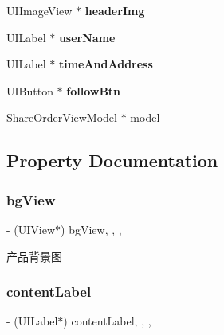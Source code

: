 \begin{DoxyCompactItemize}
\item 
\mbox{\label{interface_share_details_cell_adc57995f3561242d09f290796a3e4274}} 
U\+I\+Image\+View $\ast$ {\bfseries header\+Img}
\item 
\mbox{\label{interface_share_details_cell_a6776d4a0c07ea41e931193a2515f7701}} 
U\+I\+Label $\ast$ {\bfseries user\+Name}
\item 
\mbox{\label{interface_share_details_cell_a802beea7ae23e920023619a5473c52c4}} 
U\+I\+Label $\ast$ {\bfseries time\+And\+Address}
\item 
\mbox{\label{interface_share_details_cell_aebe6144c268f943e3e947ac1ab1e0619}} 
U\+I\+Button $\ast$ {\bfseries follow\+Btn}
\item 
\mbox{\hyperlink{interface_share_order_view_model}{Share\+Order\+View\+Model}} $\ast$ \mbox{\hyperlink{interface_share_details_cell_a6302ab5dee8cc60ea2defd78fee5d416}{model}}
\end{DoxyCompactItemize}


\subsection{Property Documentation}
\mbox{\label{interface_share_details_cell_a9c7c5c4c044c86e5a21a3d846b096cd4}} 
\subsubsection{\texorpdfstring{bg\+View}{bgView}}
{\footnotesize\ttfamily -\/ (U\+I\+View$\ast$) bg\+View\hspace{0.3cm}{\ttfamily [read]}, {\ttfamily [write]}, {\ttfamily [nonatomic]}, {\ttfamily [strong]}}

产品背景图 \mbox{\label{interface_share_details_cell_ad016f83b0f3e6eec91093a4d795972bd}} 
\subsubsection{\texorpdfstring{content\+Label}{contentLabel}}
{\footnotesize\ttfamily -\/ (U\+I\+Label$\ast$) content\+Label\hspace{0.3cm}{\ttfamily [read]}, {\ttfamily [write]}, {\ttfamily [nonatomic]}, {\ttfamily [strong]}}

